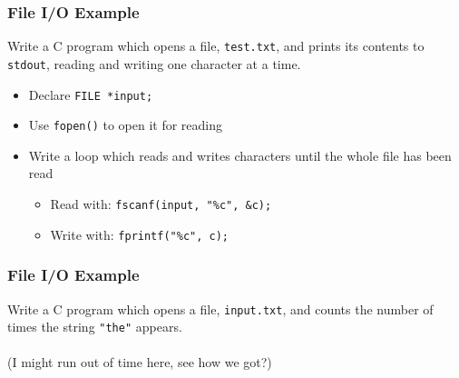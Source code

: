 \documentclass[14pt]{beamer}
\begin{document}
\begin{frame}
\frametitle{File I/O Example}
Write a C program which opens a file, \texttt{test.txt}, and prints its contents to \texttt{stdout}, reading and writing one character at a time.
\begin{itemize}
\pause
\item Declare \texttt{FILE *input;}
\pause
\item Use \texttt{fopen()} to open it for reading
\pause
\item Write a loop which reads and writes characters until the whole file has been read
	\begin{itemize}
		\item Read with: \texttt{fscanf(input, "\%c", \&c);}
		\item Write with: \texttt{fprintf("\%c", c);}
	\end{itemize}
\end{itemize}
\end{frame}

\begin{frame}
\frametitle{File I/O Example}
Write a C program which opens a file, \texttt{input.txt}, and counts the number of times the string \texttt{"the"} appears.
\\~\\
(I might run out of time here, see how we got?)
\end{frame}
\end{document}
